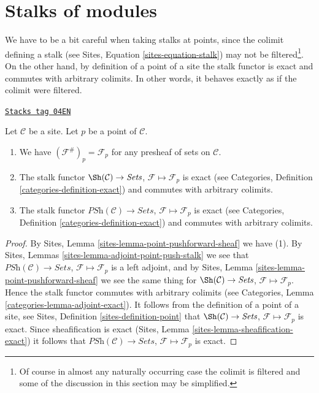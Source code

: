 \section{Stalks of modules}
\label{sites-modules-section-stalks}
We have to be a bit careful when taking stalks at points,
since the colimit defining a stalk (see
Sites, Equation \ref{sites-equation-stalk})
may not be filtered\footnote{Of course in almost any naturally occurring
case the colimit is filtered and some of the discussion in this section
may be simplified.}. On the other hand, by definition of a point of a site
the stalk functor is exact and commutes with arbitrary colimits.
In other words, it behaves exactly as if the colimit were filtered.

\begin{lemma}
\label{sites-modules-lemma-stalk-exact}
\href{https://stacks.math.columbia.edu/tag/04EN}{\texttt{Stacks tag 04EN}}

Let $\mathcal{C}$ be a site.
Let $p$ be a point of $\mathcal{C}$.
\begin{enumerate}
\item We have $(\mathcal{F}^\#)_p = \mathcal{F}_p$
for any presheaf of sets on $\mathcal{C}$.
\item The stalk functor
$\Sh(\mathcal{C}) \to \textit{Sets}$,
$\mathcal{F} \mapsto \mathcal{F}_p$ is exact (see
Categories, Definition \ref{categories-definition-exact})
and commutes with arbitrary colimits.
\item The stalk functor
$\textit{PSh}(\mathcal{C}) \to \textit{Sets}$,
$\mathcal{F} \mapsto \mathcal{F}_p$ is exact (see
Categories, Definition \ref{categories-definition-exact})
and commutes with arbitrary colimits.
\end{enumerate}
\end{lemma}

\begin{proof}
By
Sites, Lemma \ref{sites-lemma-point-pushforward-sheaf}
we have (1).
By
Sites, Lemmas \ref{sites-lemma-adjoint-point-push-stalk}
we see that
$\textit{PSh}(\mathcal{C}) \to \textit{Sets}$,
$\mathcal{F} \mapsto \mathcal{F}_p$ is a left adjoint,
and by
Sites, Lemma \ref{sites-lemma-point-pushforward-sheaf}
we see the same thing for
$\Sh(\mathcal{C}) \to \textit{Sets}$,
$\mathcal{F} \mapsto \mathcal{F}_p$.
Hence the stalk functor commutes with arbitrary colimits (see
Categories, Lemma \ref{categories-lemma-adjoint-exact}).
It follows from the definition of a point of a site, see
Sites, Definition \ref{sites-definition-point}
that $\Sh(\mathcal{C}) \to \textit{Sets}$,
$\mathcal{F} \mapsto \mathcal{F}_p$
is exact. Since sheafification is exact
(Sites, Lemma \ref{sites-lemma-sheafification-exact})
it follows that $\textit{PSh}(\mathcal{C}) \to \textit{Sets}$,
$\mathcal{F} \mapsto \mathcal{F}_p$
is exact.
\end{proof}

